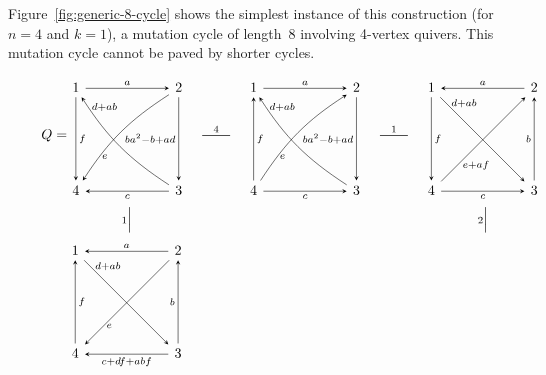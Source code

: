 \documentclass[11pt, letterpaper]{amsart}
\theoremstyle{definition}
\numberwithin{equation}{section}
\newcommand{\mutation}[1]{\stackrel{#1}{\rule[.5ex]{2em}{0.5pt}}}
\newcommand{\vmutation}[1]{  {\scriptstyle #1}{\Bigl|\Bigr.}  }
\begin{document}
Figure~\ref{fig:generic-8-cycle} shows the simplest instance of this construction 
(for $n=4$ and $k=1$), a mutation cycle of length~8 involving 4-vertex quivers.
This mutation cycle cannot be paved by shorter cycles. 

\begin{figure}[ht]
\begin{equation*}
\hspace{7pt} 
\begin{array}{ccccccc}
\hspace{-17pt} Q=\!\!\begin{tikzcd}[arrows={-stealth}, sep=6em]
  1  \arrow[r,  "a"]
  & 2  \arrow[d, swap, "ba^2-b+ad"]
  \\
   4 \arrow[ur, "e", swap, bend left=12, near start, outer sep=-1.8, stealth-] \arrow[u, "f", swap, stealth-] \arrow[r, "c", swap, stealth-]  
   & 3  \arrow[ul, "d+ab", swap, bend left=12, very near end, outer sep=-1.8]
\end{tikzcd}
 & \mutation{4}
 &
\begin{tikzcd}[arrows={-stealth}, sep=6em]
  1  \arrow[r,  "a"]
  & 2  \arrow[d, swap, "ba^2-b+ad"]
  \\
   4 \arrow[ur, "e", swap, near start, bend left=12, outer sep=-1.8] \arrow[u, swap, "f"] \arrow[r, "c", swap]  
   & 3  \arrow[ul, "d+ab", swap, very near end, bend left=12, outer sep=-1.8]
\end{tikzcd}
 & \mutation{1}
 & \begin{tikzcd}[arrows={-stealth}, sep=6em]
  1  \arrow[r,  "a", stealth-]
  & 2  \arrow[d, "b", swap, stealth-]
  \\
   4 \arrow[ur, "e+af", swap, near start, outer sep=-1.8] \arrow[u, swap, "f", stealth-] \arrow[r, "c", swap]  
   & 3  \arrow[ul, "d+ab", swap, very near end, outer sep=-1.8, stealth-]
\end{tikzcd}
\\
\\[-8pt]
\vmutation{1}   & & & & \vmutation{2} \\[-6pt]
\\
\begin{tikzcd}[arrows={stealth-}, sep=6em]
  1  \arrow[r,  "a"]
  & 2  \arrow[d, swap, "b"]
  \\
   4 \arrow[ur, "e", swap, near start, outer sep=-1.8, stealth-] \arrow[u, swap, "f", -stealth] \arrow[r, "c+df+abf", swap, stealth-]  
   & 3  \arrow[ul, "d+ab", swap, very near end, outer sep=-1.8]
\end{tikzcd}
 &\multicolumn{3}{c}{}
 

\end{array}
\end{equation*}
\end{figure}
\end{document}
